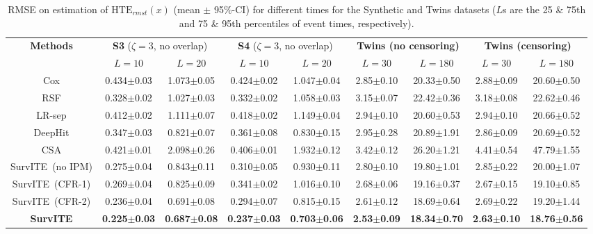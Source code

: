 \documentclass{article}
\newcommand{\proposed}{{SurvITE}}
\begin{document}
\begin{table}[t!]
	\caption{RMSE on estimation of $\text{HTE}_{rmst}(x)$  (mean $\pm$ 95\%-CI) for different times for the Synthetic and Twins datasets ($L$s are the 25 \& 75th and 75 \& 95th percentiles of event times, respectively).} \label{Table:RMST}
	\begin{center}
	\fontsize{6.3}{7}\selectfont
        \begin{tabular}{c c c c c c c c c}
        \toprule
        \multirow{2}{*}{\textbf{Methods}}
        &\multicolumn{2}{c}{\textbf{S3} ($\zeta=3$, no overlap)}
        &\multicolumn{2}{c}{\textbf{S4} ($\zeta=3$, no overlap)}
        &\multicolumn{2}{c}{\textbf{Twins (no censoring)}} 
        &\multicolumn{2}{c}{\textbf{Twins (censoring)}} \\ 
        &$L=10$&$L=20$&$L=10$&$L=20$&$L=30$&$L=180$&$L=30$&$L=180$\\\midrule
        Cox         &0.434$\pm$0.03 &1.073$\pm$0.05 &0.424$\pm$0.02
                &1.047$\pm$0.04 &2.85$\pm$0.10 &20.33$\pm$0.50&2.88$\pm$0.09 &20.60$\pm$0.50\\ 
        RSF         &0.328$\pm$0.02 &1.027$\pm$0.03 &0.332$\pm$0.02 &1.058$\pm$0.03 &3.15$\pm$0.07 &22.42$\pm$0.36 &3.18$\pm$0.08 &22.62$\pm$0.46\\
        LR-sep      &0.412$\pm$0.02 &1.111$\pm$0.07 &0.418$\pm$0.02 &1.149$\pm$0.04 &2.94$\pm$0.10 &20.60$\pm$0.53 &2.94$\pm$0.10 &20.66$\pm$0.52\\
        DeepHit	    &0.347$\pm$0.03 &0.821$\pm$0.07 &0.361$\pm$0.08 &0.830$\pm$0.15 &2.95$\pm$0.28 &20.89$\pm$1.91 &2.86$\pm$0.09 &20.69$\pm$0.52\\
        CSA         &0.421$\pm$0.01 &2.098$\pm$0.26 &0.406$\pm$0.01 &1.932$\pm$0.12 &3.42$\pm$0.12 &26.20$\pm$1.21 &4.41$\pm$0.54 &47.79$\pm$1.55\\  \midrule
        \proposed~(no IPM) &0.275$\pm$0.04 &0.843$\pm$0.11 &0.310$\pm$0.05 &0.930$\pm$0.11 &2.80$\pm$0.10 &19.80$\pm$1.01 &2.85$\pm$0.22 &20.00$\pm$1.07 \\ 
        \proposed~(CFR-1)   &0.269$\pm$0.04 &0.825$\pm$0.09 &0.341$\pm$0.02 &1.016$\pm$0.10 &2.68$\pm$0.06 &19.16$\pm$0.37 &2.67$\pm$0.15 &19.10$\pm$0.85\\ 
         \proposed~(CFR-2)    &0.236$\pm$0.04 &0.691$\pm$0.08 &0.294$\pm$0.07 &0.815$\pm$0.15 &2.61$\pm$0.12 &18.69$\pm$0.64 &2.69$\pm$0.22 &19.20$\pm$1.44\\
        \textbf{\proposed} &\textbf{0.225$\pm$0.03} &\textbf{0.687$\pm$0.08} &\textbf{0.237$\pm$0.03} &\textbf{0.703$\pm$0.06} &\textbf{2.53$\pm$0.09} &\textbf{18.34$\pm$0.70} &\textbf{2.63$\pm$0.10} &\textbf{18.76$\pm$0.56}\\ \bottomrule
        \end{tabular}
	\end{center}
	        \vskip -0.1in
\end{table}
\end{document}
